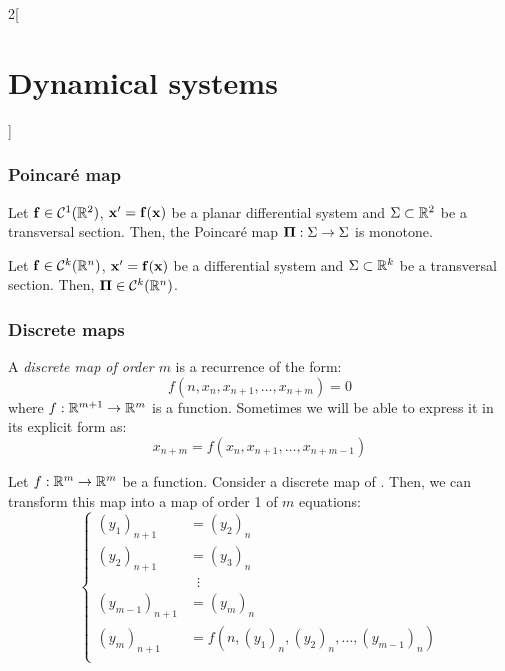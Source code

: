 \documentclass[../../../main_math.tex]{subfiles}
\begin{document}
\begin{multicols}{2}[\section{Dynamical systems}]
  \subsubsection{Poincaré map}
  \begin{proposition}
    Let $\boldsymbol{\mathrm{f}}\in\mathcal{C}^1(\mathbb{R}^2)$, $\boldsymbol{\mathrm{x}}'=\boldsymbol{\mathrm{f}}(\boldsymbol{\mathrm{x}})$ be a planar differential system and $\Sigma\subset \mathbb{R}^2$ be a transversal section. Then, the Poincaré map $\boldsymbol{\mathrm{\Pi}}:\Sigma\rightarrow\Sigma$ is monotone.
  \end{proposition}
  \begin{proposition}
    Let $\boldsymbol{\mathrm{f}}\in\mathcal{C}^k(\mathbb{R}^n)$, $\boldsymbol{\mathrm{x}}'=\boldsymbol{\mathrm{f}}(\boldsymbol{\mathrm{x}})$ be a differential system and $\Sigma\subset \mathbb{R}^k$ be a transversal section. Then, $\boldsymbol{\mathrm{\Pi}}\in\mathcal{C}^k(\mathbb{R}^n)$.
  \end{proposition}
  \subsubsection{Discrete maps}
  \begin{definition}
    A \emph{discrete map of order $m$} is a recurrence of the form:
    \begin{equation}
      f(n,x_n,x_{n+1},\ldots,x_{n+m})=0
    \end{equation}
    where $f:\mathbb{R}^{m+1}\rightarrow\mathbb{R}^m$ is a function. Sometimes we will be able to express it in its explicit form as:
    \begin{equation}\label{DS:discretemap}
      x_{n+m}=f(x_n,x_{n+1},\ldots,x_{n+m-1})
    \end{equation}
  \end{definition}
  \begin{proposition}
    Let $f:\mathbb{R}^{m}\rightarrow\mathbb{R}^m$ be a function. Consider a discrete map of . Then, we can transform this map into a map of order 1 of $m$ equations:
    \begin{equation*}
      \left\{
      \begin{aligned}
        {(y_1)}_{n+1}     & ={(y_2)}_{n}                                   \\
        {(y_2)}_{n+1}     & ={(y_3)}_{n}                                   \\
                          & \;\;\vdots                                     \\
        {(y_{m-1})}_{n+1} & ={(y_m)}_{n}                                   \\
        {(y_m)}_{n+1}     & =f(n,{(y_1)}_n,{(y_2)}_n,\ldots,{(y_{m-1})}_n) \\

\end{aligned}
\end{equation*}
\end{proposition}
\end{multicols}
\end{document}
